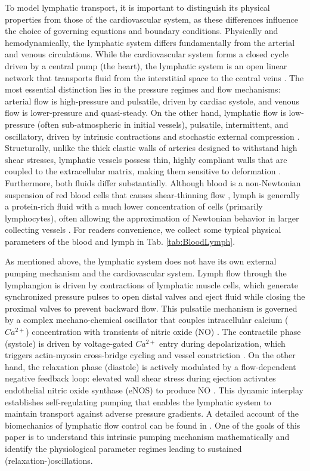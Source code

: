 \documentclass[12pt,a4paper]{article}
\begin{document}
To model lymphatic transport, it is important to distinguish its physical properties from those of the cardiovascular system, as these differences influence the choice of governing equations and boundary conditions. Physically and hemodynamically, the lymphatic system differs fundamentally from the arterial and venous circulations. While the cardiovascular system forms a closed cycle driven by a central pump (the heart), the lymphatic system is an open linear network that transports fluid from the interstitial space to the central veins \cite{alitalo2002molecular, jafarnejad2015modeling}. The most essential distinction lies in the pressure regimes and flow mechanisms: arterial flow is high-pressure and pulsatile, driven by cardiac systole, and venous flow is lower-pressure and quasi-steady. On the other hand, lymphatic flow is low-pressure (often sub-atmospheric in initial vessels), pulsatile, intermittent, and oscillatory, driven by intrinsic contractions and stochastic external compression \cite{moore2018lymphatic}. Structurally, unlike the thick elastic walls of arteries designed to withstand high shear stresses, lymphatic vessels possess thin, highly compliant walls that are coupled to the extracellular matrix, making them sensitive to deformation \cite{breslin2019lymphatic}. Furthermore, both fluids differ substantially. Although blood is a non-Newtonian suspension of red blood cells that causes shear-thinning flow \cite{alexy2022physical}, lymph is generally a protein-rich fluid with a much lower concentration of cells (primarily lymphocytes), often allowing the approximation of Newtonian behavior in larger collecting vessels \cite{santambrogio2018lymphatic}. For readers convenience, we collect some typical physical parameters of the blood and lymph in Tab. \ref{tab:BloodLymph}.

As mentioned above, the lymphatic system does not have its own external pumping mechanism and the cardiovascular system. Lymph flow through the lymphangion is driven by contractions of lymphatic muscle cells, which generate synchronized pressure pulses to open distal valves and eject fluid while closing the proximal valves to prevent backward flow. This pulsatile mechanism is governed by a complex mechano-chemical oscillator that couples intracellular calcium ($Ca^{2+}$) concentration with transients of nitric oxide (NO) \cite{munn2015mechanobiology}. The contractile phase (systole) is driven by voltage-gated $Ca^{2+}$ entry during depolarization, which triggers actin-myosin cross-bridge cycling and vessel constriction \cite{scallan2016lymphatic}. On the other hand, the relaxation phase (diastole) is actively modulated by a flow-dependent negative feedback loop: elevated wall shear stress during ejection activates endothelial nitric oxide synthase (eNOS) to produce NO \cite{kunert2015mechanobiological,ohhashi2023physiological}. This dynamic interplay establishes self-regulating pumping that enables the lymphatic system to maintain transport against adverse pressure gradients. A detailed account of the biomechanics of lymphatic flow control can be found in \cite{angeli2023biomechanical}. One of the goals of this paper is to understand this intrinsic pumping mechanism mathematically and identify the physiological parameter regimes leading to sustained (relaxation-)oscillations. 
\end{document}
